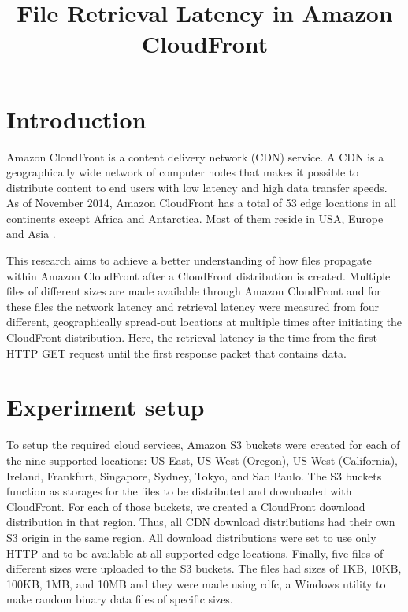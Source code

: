 \documentclass[conference]{IEEEtran}
\begin{document}
%
\title{File Retrieval Latency in Amazon CloudFront}


\author{
\and
{}
}


\maketitle

\IEEEpeerreviewmaketitle


\section{Introduction}
Amazon CloudFront is a content delivery network (CDN) service. A CDN is a geographically wide network of computer nodes that makes it possible to distribute content to end users with low latency and high data transfer speeds. As of November 2014, Amazon CloudFront has a total of 53 edge locations in all continents except Africa and Antarctica. Most of them reside in USA, Europe and Asia \cite{CloudFront_product_details}.

This research aims to achieve a better understanding of how files propagate within Amazon CloudFront after a CloudFront distribution is created.  Multiple files of different sizes are made available through Amazon CloudFront and for these files the network latency and retrieval latency were measured from four different, geographically spread-out locations at multiple times after initiating the CloudFront distribution. Here, the retrieval latency is the time from the first HTTP GET request until the first response packet that contains data.


\section{Experiment setup}
To setup the required cloud services, Amazon S3 buckets were created for each of the nine supported locations: US East, US West (Oregon), US West (California), Ireland, Frankfurt, Singapore, Sydney, Tokyo, and Sao Paulo. The S3 buckets function as storages for the files to be distributed and downloaded with CloudFront. For each of those buckets, we created a CloudFront download distribution in that region. Thus, all CDN download distributions had their own S3 origin in the same region. All download distributions were set to use only HTTP and to be available at all supported edge locations. Finally, five files of different sizes were uploaded to the S3 buckets. The files had sizes of 1KB, 10KB, 100KB, 1MB, and 10MB and they were made using rdfc, a Windows utility to make random binary data files of specific sizes.
\end{document}
